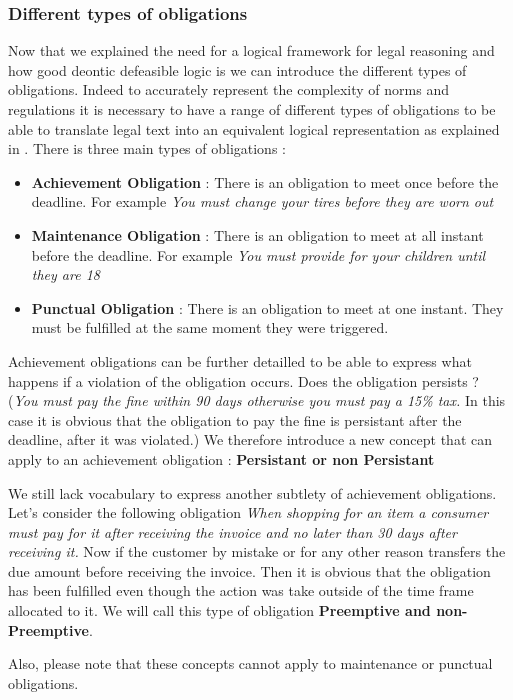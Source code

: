 \documentclass[10pt]{report}
\begin{document}
\subsubsection{Different types of obligations}
Now that we explained the need for a logical framework for legal reasoning and how good deontic defeasible logic is we can introduce the different types of obligations. Indeed to accurately represent the complexity of norms and regulations it is necessary to have a range of different types of obligations to be able to translate legal text into an equivalent logical representation as explained in \autocite{ConceptuallyRichModelofBPC}. There is three main types of obligations :
\begin{itemize}
\item \textbf{Achievement Obligation} : There is an obligation to meet once before the deadline. For example \textit{You must change your tires before they are worn out}
\item \textbf{Maintenance Obligation} : There is an obligation to meet at all instant before the deadline. For example \textit{You must provide for your children until they are 18}
\item \textbf{Punctual Obligation} : There is an obligation to meet at one instant. They must be fulfilled at the same moment they were triggered.
\end{itemize}

Achievement obligations can be further detailled to be able to express what happens if a violation of the obligation occurs. Does the obligation persists ? (\textit{You must pay the fine within 90 days otherwise you must pay a 15\% tax.} In this case it is obvious that the obligation to pay the fine is persistant after the deadline, after it was violated.) We therefore introduce a new concept that can apply to an achievement obligation : \textbf{Persistant or non Persistant}

We still lack vocabulary to express another subtlety of achievement obligations. Let's consider the following obligation \textit{When shopping for an item a consumer must pay for it after receiving the invoice and no later than 30 days after receiving it.} Now if the customer by mistake or for any other reason transfers the due amount before receiving the invoice. Then it is obvious that the obligation has been fulfilled even though the action was take outside of the time frame allocated to it. We will call this type of obligation \textbf{Preemptive and non-Preemptive}. 

Also, please note that these concepts cannot apply to maintenance or punctual obligations.
\end{document}
